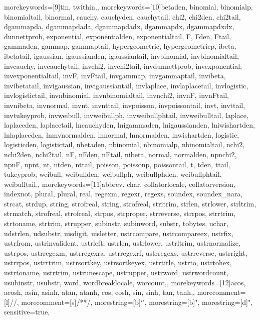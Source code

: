{	%
	morekeywords=[9]{tin, twithin,},
	morekeywords=[10]{betaden, binomial, binomialp, binomialtail, binormal, cauchy, cauchyden, cauchytail, chi2, chi2den, chi2tail, dgammapda, dgammapdada, dgammapdadx, dgammapdx, dgammapdxdx, dunnettprob, exponential, exponentialden, exponentialtail, F, Fden, Ftail, gammaden, gammap, gammaptail, hypergeometric, hypergeometricp, ibeta, ibetatail, igaussian, igaussianden, igaussiantail, invbinomial, invbinomialtail, invcauchy, invcauchytail, invchi2, invchi2tail, invdunnettprob, invexponential, invexponentialtail, invF, invFtail, invgammap, invgammaptail, invibeta, invibetatail, invigaussian, invigaussiantail, invlaplace, invlaplacetail, invlogistic, invlogistictail, invnbinomial, invnbinomialtail, invnchi2, invnF, invnFtail, invnibeta, invnormal, invnt, invnttail, invpoisson, invpoissontail, invt, invttail, invtukeyprob, invweibull, invweibullph, invweibullphtail, invweibulltail, laplace, laplaceden, laplacetail, lncauchyden, lnigammaden, lnigaussianden, lniwishartden, lnlaplaceden, lnmvnormalden, lnnormal, lnnormalden, lnwishartden, logistic, logisticden, logistictail, nbetaden, nbinomial, nbinomialp, nbinomialtail, nchi2, nchi2den, nchi2tail, nF, nFden, nFtail, nibeta, normal, normalden, npnchi2, npnF, npnt, nt, ntden, nttail, poisson, poissonp, poissontail, t, tden, ttail, tukeyprob, weibull, weibullden, weibullph, weibullphden, weibullphtail, weibulltail,},
	morekeywords=[11]{abbrev, char, collatorlocale, collatorversion, indexnot, plural, plural, real, regexm, regexr, regexs, soundex, soundex_nara, strcat, strdup, string, strofreal, string, strofreal, stritrim, strlen, strlower, strltrim, strmatch, strofreal, strofreal, strpos, strproper, strreverse, strrpos, strrtrim, strtoname, strtrim, strupper, subinstr, subinword, substr, tobytes, uchar, udstrlen, udsubstr, uisdigit, uisletter, ustrcompare, ustrcompareex, ustrfix, ustrfrom, ustrinvalidcnt, ustrleft, ustrlen, ustrlower, ustrltrim, ustrnormalize, ustrpos, ustrregexm, ustrregexra, ustrregexrf, ustrregexs, ustrreverse, ustrright, ustrrpos, ustrrtrim, ustrsortkey, ustrsortkeyex, ustrtitle, ustrto, ustrtohex, ustrtoname, ustrtrim, ustrunescape, ustrupper, ustrword, ustrwordcount, usubinstr, usubstr, word, wordbreaklocale, worcount,},
	morekeywords=[12]{acos, acosh, asin, asinh, atan, atanh, cos, cosh, sin, sinh, tan, tanh,},
	morecomment=[l]{//},
	morecomment=[s]{/*}{*/},
	morestring=[b]{`}{'},
	morestring=[b]",
	morestring=[d]",
	sensitive=true,
}

